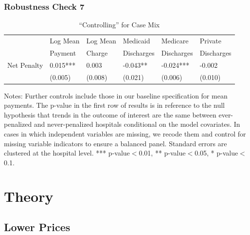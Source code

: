 \documentclass[ucs,9pt]{beamer}
\begin{document}
\begin{frame}
\frametitle{Robustness Check 7}
\begin{table}[htp]
\centering \normalsize
\caption{``Controlling'' for Case Mix}
\footnotesize
\begin{tabular}{llllll}
\hline	
\hline
 			& Log Mean 		& Log Mean	& Medicaid 	   	& Medicare   		& Private  			\\
			& Payment		& 	Charge	& Discharges      	& Discharges       	& Discharges    \\
\hline											
Net Penalty	&	0.015***	&	0.003	&	-0.043**	&	-0.024***	&	-0.002	\\
			&	(0.005)	&	(0.008)	&	(0.021)	&	(0.006)	&	(0.010)	\\
\end{tabular}
\end{table}
\tiny Notes: Further controls include those in our baseline specification for mean payments.  The p-value in the first row of results is in reference to the null hypothesis that trends in the outcome of interest are the same between ever-penalized and never-penalized hospitals conditional on the model covariates.  In cases in which independent variables are missing, we recode them and control for missing variable indicators to ensure a balanced panel.  Standard errors are clustered at the hospital level.  *** p-value$<$0.01, ** p-value$<$0.05, * p-value$<$0.1.
\end{frame}



\section{Theory}
\subsection{Lower Prices}
\end{document}
